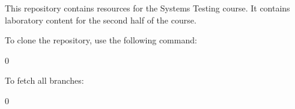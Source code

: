 This repository contains resources for the Systems Testing course. It contains laboratory content for the second half of the course.

To clone the repository, use the following command\+: 
\begin{DoxyCode}{0}

\end{DoxyCode}


To fetch all branches\+: 
\begin{DoxyCode}{0}

\end{DoxyCode}
 
